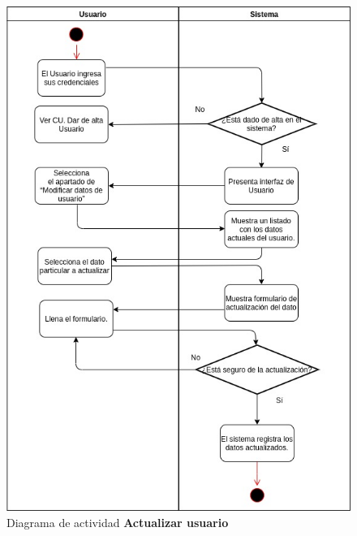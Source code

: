 \pagebreak
\begin{figure}[h]
\centering
\caption{Diagrama de actividad \textbf{Actualizar usuario}}\label{fig:priorReq}
\includegraphics[width=1\textwidth, height=1.5\textwidth]{images/diag_act_actualizar_usuario}
\end{figure}

